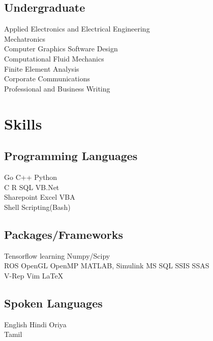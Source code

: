 \documentclass[]{deedy-resume-openfont}
\begin{document}
\begin{minipage}[t]{0.33\textwidth}
\sectionsep{}

\subsection{Undergraduate}
Applied Electronics and Electrical Engineering\\
Mechatronics \\
Computer Graphics Software Design \\
Computational Fluid Mechanics\\
Finite Element Analysis\\
Corporate Communications\\
Professional and Business Writing\\
\sectionsep


\section{Skills}

\subsection{Programming Languages}

Go \textbullet{} C++ \textbullet{} Python \\C \textbullet{}
R \textbullet{} SQL \textbullet{} VB.Net \\
Sharepoint \textbullet{} Excel VBA\\
Shell Scripting(Bash)

\sectionsep

\subsection{Packages/Frameworks}

Tensorflow {learning} \textbullet{}Numpy/Scipy  \\ 
ROS \textbullet{}  OpenGL \textbullet{} OpenMP 
MATLAB, Simulink \textbullet{}
MS SQL \textbullet{} SSIS \textbullet{} SSAS \\
V-Rep \textbullet{} Vim \textbullet{} \LaTeX 

\sectionsep

\subsection{Spoken Languages}
English \textbullet{} Hindi \textbullet{} Oriya \\
Tamil

%
%

\end{minipage} 
\end{document}
